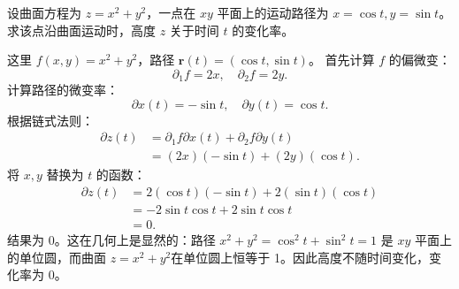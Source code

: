 \documentclass[12pt,UTF8,fontset=none]{ctexbook}
\begin{document}


\begin{et}
设曲面方程为 $z = x^2 + y^2$，一点在 $xy$ 平面上的运动路径为 $x = \cos t, y = \sin t$。求该点沿曲面运动时，高度 $z$ 关于时间 $t$ 的变化率。
\end{et}
\begin{so}
这里 $f(x, y) = x^2 + y^2$，路径 $\mathbf{r}(t) = (\cos t, \sin t)$。
首先计算 $f$ 的偏微变：
$$ \partial_1 f = 2x, \quad \partial_2 f = 2y. $$
计算路径的微变率：
$$ \partial x(t) = -\sin t, \quad \partial y(t) = \cos t. $$
根据链式法则：
\begin{align*}
\partial z(t) &= \partial_1 f \partial x(t) + \partial_2 f \partial y(t) \\
&= (2x)(-\sin t) + (2y)(\cos t).
\end{align*}
将 $x, y$ 替换为 $t$ 的函数：
\begin{align*}
\partial z(t) &= 2(\cos t)(-\sin t) + 2(\sin t)(\cos t) \\
&= -2\sin t \cos t + 2\sin t \cos t \\
&= 0.
\end{align*}
结果为 0。这在几何上是显然的：路径 $x^2 + y^2 = \cos^2 t + \sin^2 t = 1$ 是 $xy$ 平面上的单位圆，而曲面 $z = x^2 + y^2$在单位圆上恒等于 1。因此高度不随时间变化，变化率为 0。
\end{so}
\end{document}
